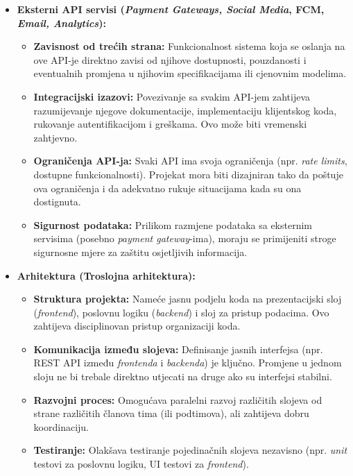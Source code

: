 \begin{itemize}
    \item \textbf{Eksterni API servisi (\textit{Payment Gateways, Social Media}, FCM, \textit{Email, Analytics}):}
    
        \begin{itemize}
            \item \textbf{Zavisnost od trećih strana:} Funkcionalnost sistema koja se oslanja na ove API-je direktno zavisi od njihove dostupnosti, pouzdanosti i eventualnih promjena u njihovim specifikacijama ili cjenovnim modelima.
            
            \item \textbf{Integracijski izazovi:} Povezivanje sa svakim API-jem zahtijeva razumijevanje njegove dokumentacije, implementaciju klijentskog koda, rukovanje autentifikacijom i greškama. Ovo može biti vremenski zahtjevno.
            
            \item \textbf{Ograničenja API-ja:} Svaki API ima svoja ograničenja (npr. \textit{rate limits}, dostupne funkcionalnosti). Projekat mora biti dizajniran tako da poštuje ova ograničenja i da adekvatno rukuje situacijama kada su ona dostignuta.
            
            \item \textbf{Sigurnost podataka:} Prilikom razmjene podataka sa eksternim servisima (posebno \textit{payment gateway}-ima), moraju se primijeniti stroge sigurnosne mjere za zaštitu osjetljivih informacija.
        \end{itemize}
    
    \item \textbf{Arhitektura (Troslojna arhitektura):}

        \begin{itemize}
            \item \textbf{Struktura projekta:} Nameće jasnu podjelu koda na prezentacijski sloj (\textit{frontend}), poslovnu logiku (\textit{backend}) i sloj za pristup podacima. Ovo zahtijeva disciplinovan pristup organizaciji koda.
            
            \item \textbf{Komunikacija između slojeva:} Definisanje jasnih interfejsa (npr. REST API između \textit{frontenda} i \textit{backenda}) je ključno. Promjene u jednom sloju ne bi trebale direktno utjecati na druge ako su interfejsi stabilni.
            
            \item \textbf{Razvojni proces:} Omogućava paralelni razvoj različitih slojeva od strane različitih članova tima (ili podtimova), ali zahtijeva dobru koordinaciju.
            
            \item \textbf{Testiranje:} Olakšava testiranje pojedinačnih slojeva nezavisno (npr. \textit{unit} testovi za poslovnu logiku, UI testovi za \textit{frontend}).
        \end{itemize}
    
\end{itemize}

